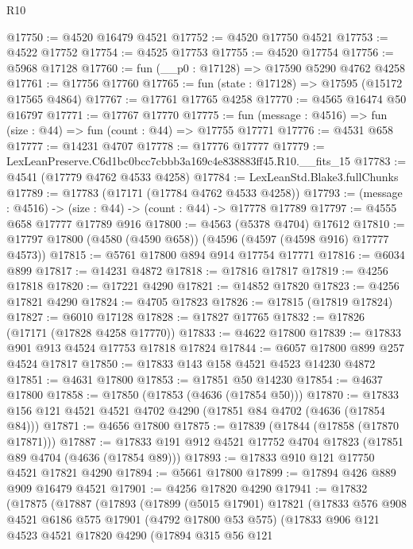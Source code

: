 \begin{lexlean}{R10}
\begin{coremodule}
@17750 := @4520 @16479 @4521
@17752 := @4520 @17750 @4521
@17753 := @4522 @17752
@17754 := @4525 @17753
@17755 := @4520 @17754
@17756 := @5968 @17128
@17760 := fun (__p0 : @17128) => @17590 @5290 @4762 @4258
@17761 := @17756 @17760
@17765 := fun (state : @17128) => @17595 (@15172 @17565 @4864)
@17767 := @17761 @17765 @4258
@17770 := @4565 @16474 @50 @16797
@17771 := @17767 @17770
@17775 := fun (message : @4516) => fun (size : @44) => fun (count : @44) => @17755 @17771
@17776 := @4531 @658
@17777 := @14231 @4707
@17778 := @17776 @17777
@17779 := LexLeanPreserve.C6d1bc0bcc7cbbb3a169c4e838883ff45.R10.__fits_15
@17783 := @4541 (@17779 @4762 @4533 @4258)
@17784 := LexLeanStd.Blake3.fullChunks
@17789 := @17783 (@17171 (@17784 @4762 @4533 @4258))
@17793 := (message : @4516) -> (size : @44) -> (count : @44) -> @17778 @17789
@17797 := @4555 @658 @17777 @17789 @916
@17800 := @4563 (@5378 @4704) @17612
@17810 := @17797 @17800 (@4580 (@4590 @658)) (@4596 (@4597 (@4598 @916) @17777 @4573))
@17815 := @5761 @17800 @894 @914 @17754 @17771
@17816 := @6034 @899
@17817 := @14231 @4872
@17818 := @17816 @17817
@17819 := @4256 @17818
@17820 := @17221 @4290
@17821 := @14852 @17820
@17823 := @4256 @17821 @4290
@17824 := @4705 @17823
@17826 := @17815 (@17819 @17824)
@17827 := @6010 @17128
@17828 := @17827 @17765
@17832 := @17826 (@17171 (@17828 @4258 @17770))
@17833 := @4622 @17800
@17839 := @17833 @901 @913 @4524 @17753 @17818 @17824
@17844 := @6057 @17800 @899 @257 @4524 @17817
@17850 := @17833 @143 @158 @4521 @4523 @14230 @4872
@17851 := @4631 @17800
@17853 := @17851 @50 @14230
@17854 := @4637 @17800
@17858 := @17850 (@17853 (@4636 (@17854 @50)))
@17870 := @17833 @156 @121 @4521 @4521 @4702 @4290 (@17851 @84 @4702 (@4636 (@17854 @84)))
@17871 := @4656 @17800
@17875 := @17839 (@17844 (@17858 (@17870 @17871)))
@17887 := @17833 @191 @912 @4521 @17752 @4704 @17823 (@17851 @89 @4704 (@4636 (@17854 @89)))
@17893 := @17833 @910 @121 @17750 @4521 @17821 @4290
@17894 := @5661 @17800
@17899 := @17894 @426 @889 @909 @16479 @4521
@17901 := @4256 @17820 @4290
@17941 := @17832
    (@17875
      (@17887
        (@17893
          (@17899
            (@5015 @17901)
            @17821
            (@17833
              @576
              @908
              @4521
              @6186
              @575
              @17901
              (@4792 @17800 @53 @575)
              (@17833
                @906
                @121
                @4523
                @4521
                @17820
                @4290
                (@17894
                  @315
                  @56
                  @121

\end{coremodule}
\end{lexlean}
